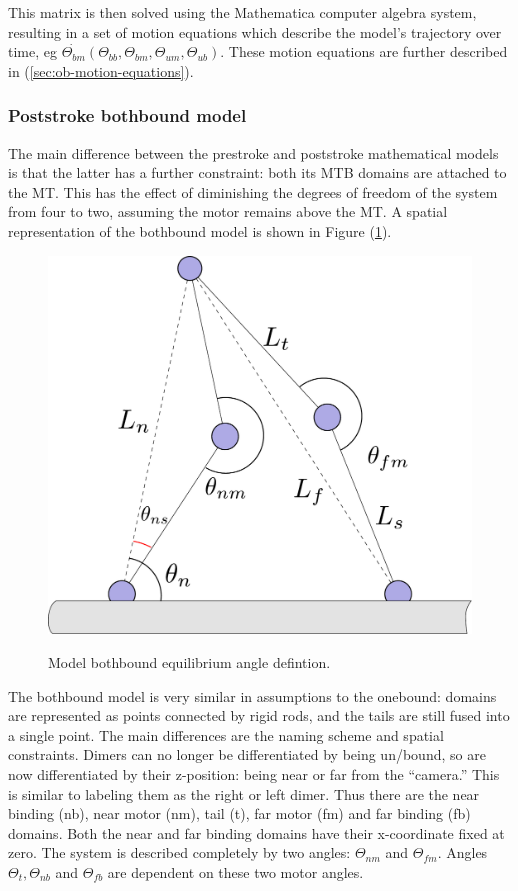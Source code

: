 \documentclass[10pt]{article} %
\begin{document}
This matrix is then solved using the Mathematica computer algebra system, resulting in a set of motion equations which describe the model's trajectory over time, eg $\dot{\Theta_{bm}}(\Theta_{bb}, \Theta_{bm}, \Theta_{um}, \Theta_{ub})$. These motion equations are further described in (\ref{sec:ob-motion-equations}).\\

\subsubsection{Poststroke bothbound model}
The main difference between the prestroke and poststroke mathematical models is that the latter has a further constraint: both its MTB domains are attached to the MT. This has the effect of diminishing the degrees of freedom of the system from four to two, assuming the motor remains above the MT. A spatial representation of the bothbound model is shown in Figure (\ref{bb_fig}).\\

\begin{figure}[h]
  \centering
  \includegraphics[width=.45\textwidth]{../../figures/code-bothbound.pdf}
  \caption{Model bothbound equilibrium angle defintion.}{}
  \label{bb_fig}
\end{figure}

The bothbound model is very similar in assumptions to the onebound: domains are represented as points connected by rigid rods, and the tails are still fused into a single point. The main differences are the naming scheme and spatial constraints. Dimers can no longer be differentiated by being un/bound, so are now differentiated by their z-position: being near or far from the ``camera.'' This is similar to labeling them as the right or left dimer. Thus there are the near binding (nb), near motor (nm), tail (t), far motor (fm) and far binding (fb) domains. Both the near and far binding domains have their x-coordinate fixed at zero. The system is described completely by two angles: $\Theta_{nm}$ and $\Theta_{fm}$. Angles $\Theta_t, \Theta_{nb}$ and $\Theta_{fb}$ are dependent on these two motor angles.\\
\end{document}
